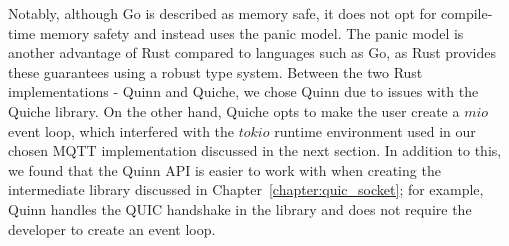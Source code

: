 Notably, although Go is described as memory safe, it does not opt for compile-time memory safety and instead uses the panic model.
The panic model is another advantage of Rust compared to languages such as Go, as Rust provides these guarantees using a robust type system.
Between the two Rust implementations - Quinn and Quiche, we chose Quinn due to issues with the Quiche library.
On the other hand, Quiche opts to make the user create a $mio$ event loop, which interfered with the $tokio$ runtime environment used in our chosen MQTT implementation discussed in the next section.
In addition to this, we found that the Quinn API is easier to work with when creating the intermediate library discussed in Chapter~\ref{chapter:quic_socket}; for example, Quinn handles the QUIC handshake in the library and does not require the developer to create an event loop.
